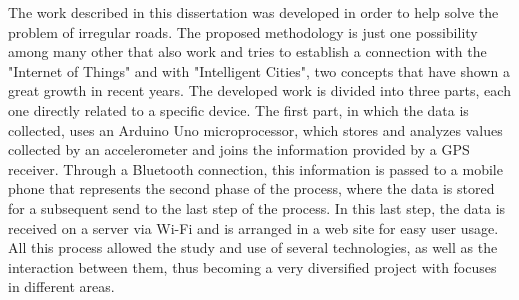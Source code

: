 The work described in this dissertation was developed in order to help solve the problem of irregular roads.
The proposed methodology is just one possibility among many other that also work and tries to establish a connection with the "Internet of Things" and with "Intelligent Cities", two concepts that have shown a great growth in recent years.
The developed work is divided into three parts, each one directly related to a specific device.
The first part, in which the data is collected, uses an Arduino Uno microprocessor, which stores and analyzes values collected by an accelerometer and joins the information provided by a GPS receiver.
Through a Bluetooth connection, this information is passed to a mobile phone that represents the second phase of the process, where the data is stored for a subsequent send to the last step of the process.
In this last step, the data is received on a server via Wi-Fi and is arranged in a web site for easy user usage.
All this process allowed the study and use of several technologies, as well as the interaction between them, thus becoming a very diversified project with focuses in different areas.